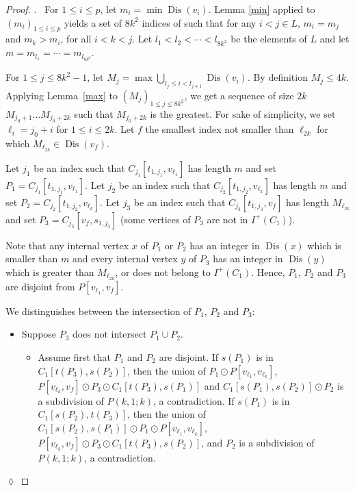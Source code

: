 \documentclass[utf8,11pt]{article}
\theoremstyle{plain}
\theoremstyle{definition}
\theoremstyle{remark}
\newenvironment{subproof}{\par\noindent {\it Subproof}.\ }{\hfill$\lozenge$\par\vspace{11pt}}
\DeclareMathOperator{\Dis}{Dis}
\begin{document}
\begin{proof}
\begin{subproof}
For $1\leq i\leq p$, let $m_i = \min \Dis(v_i)$. 
Lemma \ref{min} applied to $(m_i)_{1\leq i\leq p}$ yields  a set of $8k^2$ indices of such that 
for any $i< j \in L$,  $m_i=m_j$ and $m_k > m_i$, for all $i< k < j$.
Let $l_1 < l_2 < \cdots < l_{8k^2}$ be the elements of $L$ and let $m= m_{l_1} = \cdots = m_{l_{8k^2}}$.


For $1\leq j\leq 8k^2-1$, let $M_j = \max \bigcup_{l_j\leq i < l_{j+1}} \Dis(v_i)$.
By definition $M_j\leq 4k$.
Applying Lemma~\ref{max} to $(M_j)_{1\leq j\leq 8k^2}$,  we get a sequence of size $2k$ $M_{j_0+1} \dots M_{j_0+{2k}}$ such that $M_{j_0+{2k}}$ is the greatest. For sake of simplicity, we set $\ell_i =j_0+i$ for $1\leq i\leq 2k$.
Let $f$ the smallest index not smaller than $\ell_{2k}$ for which $M_{\ell_{2k}} \in \Dis (v_f)$. 

Let $j_1$ be an index such that $C_{j_1}[t_{1,j_1},v_{\ell_1}]$ has length $m$ and set $P_1=C_{j_1}[t_{1,j_1},v_{\ell_1}]$.
Let $j_2$ be an index such that $C_{j_2}[t_{1,j_2},v_{\ell_k}]$ has length $m$ and set $P_2=C_{j_2}[t_{1,j_2},v_{\ell_k}]$.
Let $j_3$ be an index such that  $C_{j_3}[t_{1,j_3},v_{f}]$ has length $M_{\ell_{2k}}$ and set $P_3=C_{j_3}[v_f, s_{1,j_3}]$ (some vertices of $P_3$ are not in $I^+(C_1)$).

Note that any internal vertex $x$ of $P_1$ or $P_2$ has an integer in $\Dis(x)$
which is smaller than $m$ and every internal vertex $y$ of $P_3$ has an integer in $\Dis(y)$ which
is greater than $M_{\ell_{2k}}$, or does not belong to $I^+(C_1)$. Hence, 
$P_1$, $P_2$ and $P_3$ are disjoint from $P[v_{\ell_1},v_f]$. 


We distinguishes between the intersection of $P_1$, $P_2$ and $P_3$:

\begin{itemize}
	\item Suppose $P_3$ does not intersect $P_1 \cup P_2$.
	\begin{itemize}
		\item Assume first that $P_1$ and $P_2$ are disjoint. If $s(P_1)$ is in $C_1[t(P_3), s(P_2)]$, then the union of  $P_1 \odot P[v_{\ell_1}, v_{\ell_k}]$, $P[v_{\ell_k}, v_f] \odot P_3\odot C_1[t(P_3), s(P_1)]$ and $C_1[s(P_1), s(P_2)]\odot P_2$ is a subdivision of $P(k,1;k)$, a contradiction.
		 If $s(P_1)$ is in $C_1[ s(P_2), t(P_3)]$, then the union of  $C_1[s(P_2), s(P_1)]\odot P_1\odot P[v_{\ell_1}, v_{\ell_k}]$, $P[v_{\ell_k}, v_f]\odot  P_3\odot C_1[t(P_3), s(P_2)]$, and  $P_2$ is a subdivision of $P(k,1;k)$, a contradiction.
	

\end{itemize}
\end{itemize}
\end{subproof}
\end{proof}
\end{document}
